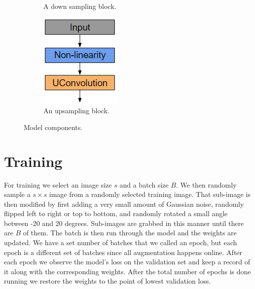 \begin{figure}
\begin{subfigure}[b]{0.25\textwidth}
				\caption{A down sampling block.}
        \label{f:dconv}
    \end{subfigure}
    \hfill
    \begin{subfigure}[b]{0.25\textwidth}
        \centering
        \includegraphics[width=\textwidth]{figures/uconv.png}
				\caption{An upsampling block.}
        \label{f:uconv}
    \end{subfigure}
    \caption{Model components.}
    \label{f:modelpieces}
\end{figure}

\section{Training}
For training we select an image size $s$ and a batch size $B$. We then randomly sample a $s\times s$ image from a randomly selected training image. That sub-image is then modified by first adding a very small amount of Gaussian noise, randomly flipped left to right or top to bottom, and randomly rotated a small angle between -20 and 20 degrees. Sub-images are grabbed in this manner until there are $B$ of them. The batch is then run through the model and the weights are updated. We have a set number of batches that we called an epoch, but each epoch is a different set of batches since all augmentation happens online. After each epoch we observe the model's loss on the validation set and keep a record of it along with the corresponding weights. After the total number of epochs is done running we restore the weights to the point of lowest validation loss.

